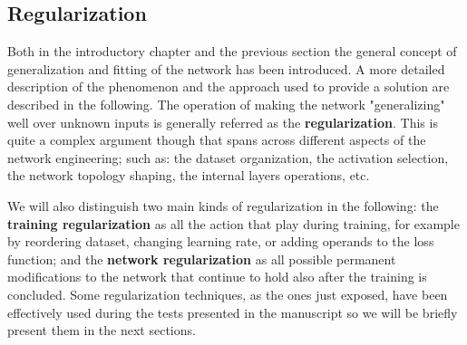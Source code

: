 
\subsection{Regularization}
\label{section:training_regularization}
Both in the introductory chapter and the previous section the general concept of generalization and fitting of the network has been introduced. A more detailed description of the phenomenon and the approach used to provide a solution are described in the following.
The operation of making the network "generalizing" well over unknown inputs is generally referred as the \textbf{regularization}. This is quite a complex argument though that spans across different aspects of the network engineering; such as: the dataset organization, the activation selection, the network topology shaping, the internal layers operations, etc. 

We will also distinguish two main kinds of regularization in the following: the \textbf{training regularization} as all the action that play during training, for example by reordering dataset, changing learning rate, or adding operands to the loss function; and the \textbf{network regularization} as all possible permanent modifications to the network that continue to hold also after the training is concluded.
Some regularization techniques, as the ones just exposed, have been effectively used during the tests presented in the manuscript so we will be briefly present them in the next sections.

